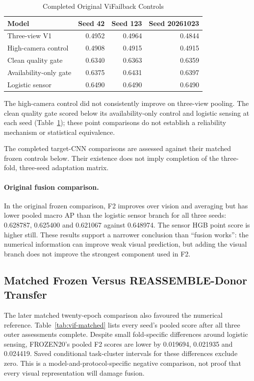 \begin{table}[htbp]
\caption{Completed Original ViFailback Controls}\label{tab:vif-controls}
\centering\small
\begin{tabular}{lrrr}\toprule
Model & Seed 42 & Seed 123 & Seed 20261023\\\midrule
Three-view V1 & 0.4952 & 0.4964 & 0.4844\\
High-camera control & 0.4908 & 0.4915 & 0.4915\\
Clean quality gate & 0.6340 & 0.6363 & 0.6359\\
Availability-only gate & 0.6375 & 0.6431 & 0.6397\\
Logistic sensor & 0.6490 & 0.6490 & 0.6490\\
\bottomrule\end{tabular}
\end{table}
The high-camera control did not consistently improve on three-view pooling. The clean
quality gate scored below its availability-only control and logistic sensing at each
seed (Table~\ref{tab:vif-controls}); these point comparisons do not establish a
reliability mechanism or statistical equivalence.

The completed target-CNN comparisons are assessed against their matched frozen controls
below. Their existence does not imply completion of the three-fold, three-seed
adaptation matrix.

\paragraph{Original fusion comparison.}
In the original frozen comparison, F2 improves over vision and averaging but has lower
pooled macro AP than the logistic sensor branch for all three seeds: 0.628787, 0.625400
and 0.621067 against 0.648974. The sensor HGB point score is higher still. These results
support a narrower conclusion than ``fusion works'': the numerical information can
improve weak visual prediction, but adding the visual branch does not improve the
strongest component used in F2.

\subsection{Matched Frozen Versus REASSEMBLE-Donor Transfer}
The later matched twenty-epoch comparison also favoured the numerical reference.
Table~\ref{tab:vif-matched} lists every seed's pooled score after all three outer
assessments complete. Despite small fold-specific differences around logistic sensing,
FROZEN20's pooled F2 scores are lower by 0.019694, 0.021935 and 0.024419. Saved
conditional task-cluster intervals for these differences exclude zero. This is a
model-and-protocol-specific negative comparison, not proof that every visual
representation will damage fusion.

